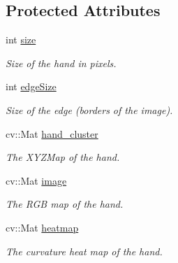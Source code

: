 \subsection*{Protected Attributes}
\begin{DoxyCompactItemize}
\item 
\hypertarget{class_hand_a11484b7843b03c2786972fec56eb2734}{}\label{class_hand_a11484b7843b03c2786972fec56eb2734} 
int \hyperlink{class_hand_a11484b7843b03c2786972fec56eb2734}{size}
\begin{DoxyCompactList}\small\item\em Size of the hand in pixels. \end{DoxyCompactList}\item 
\hypertarget{class_hand_a287a96efb8ba12064d5af85be07d64d9}{}\label{class_hand_a287a96efb8ba12064d5af85be07d64d9} 
int \hyperlink{class_hand_a287a96efb8ba12064d5af85be07d64d9}{edge\+Size}
\begin{DoxyCompactList}\small\item\em Size of the edge (borders of the image). \end{DoxyCompactList}\item 
\hypertarget{class_hand_acbe984385f832d6b1d595dc280d59206}{}\label{class_hand_acbe984385f832d6b1d595dc280d59206} 
cv\+::\+Mat \hyperlink{class_hand_acbe984385f832d6b1d595dc280d59206}{hand\+\_\+cluster}
\begin{DoxyCompactList}\small\item\em The X\+Y\+Z\+Map of the hand. \end{DoxyCompactList}\item 
\hypertarget{class_hand_abfe6cc57de5f985ac7024c5f90d7f5da}{}\label{class_hand_abfe6cc57de5f985ac7024c5f90d7f5da} 
cv\+::\+Mat \hyperlink{class_hand_abfe6cc57de5f985ac7024c5f90d7f5da}{image}
\begin{DoxyCompactList}\small\item\em The R\+GB map of the hand. \end{DoxyCompactList}\item 
\hypertarget{class_hand_ac449abf8573f0e3b313dc23c4be8f325}{}\label{class_hand_ac449abf8573f0e3b313dc23c4be8f325} 
cv\+::\+Mat \hyperlink{class_hand_ac449abf8573f0e3b313dc23c4be8f325}{heatmap}
\begin{DoxyCompactList}\small\item\em The curvature heat map of the hand. \end{DoxyCompactList}\item 
\hypertarget{class_hand_a1a90a57256c5d724a12db86cb55c57c2}{}\label{class_hand_a1a90a57256c5d724a12db86cb55c57c2} 

\end{DoxyCompactItemize}
